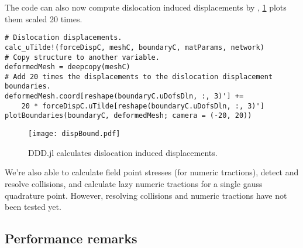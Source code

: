 The code can also now compute dislocation induced displacements by \citet{bromage2018calculating}, \cref{f:dlnDisp} plots them scaled 20 times.
\begin{verbatim}
# Dislocation displacements.
calc_uTilde!(forceDispC, meshC, boundaryC, matParams, network)
# Copy structure to another variable.
deformedMesh = deepcopy(meshC)
# Add 20 times the displacements to the dislocation displacement boundaries.
deformedMesh.coord[reshape(boundaryC.uDofsDln, :, 3)'] += 
    20 * forceDispC.uTilde[reshape(boundaryC.uDofsDln, :, 3)']
plotBoundaries(boundaryC, deformedMesh; camera = (-20, 20))
\end{verbatim}
\begin{figure}
    \centering
    \texttt{[image: dispBound.pdf]}
    \caption{DDD.jl calculates dislocation induced displacements.}
    \label{f:dlnDisp}
\end{figure}
We're also able to calculate field point stresses (for numeric tractions), detect and resolve collisions, and calculate lazy numeric tractions for a single gauss quadrature point. However, resolving collisions and numeric tractions have not been tested yet.

\subsection{Performance remarks}

